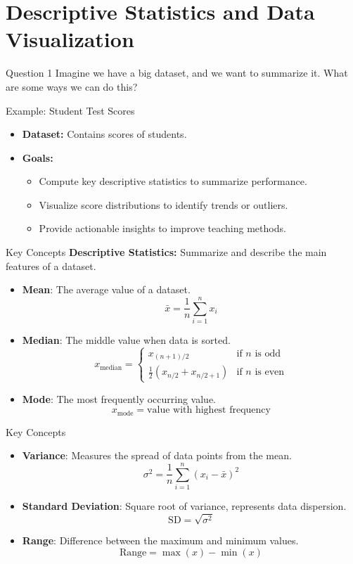 \documentclass{beamer}
\begin{document}
\section{Descriptive Statistics and Data Visualization}

\begin{frame}{Question 1}
    Imagine we have a big dataset, and we want to summarize it. What are some ways we can do this?
    \end{frame}
\begin{frame}{Example: Student Test Scores}
    \begin{itemize}
        \item \textbf{Dataset:} Contains scores of students.
        \item \textbf{Goals:}
        \begin{itemize}
            \item Compute key descriptive statistics to summarize performance.
            \item Visualize score distributions to identify trends or outliers.
            \item Provide actionable insights to improve teaching methods.
        \end{itemize}
    \end{itemize}
    \end{frame}

\begin{frame}{Key Concepts}
\textbf{Descriptive Statistics:} Summarize and describe the main features of a dataset.
\begin{itemize}
    \item \textbf{Mean}: The average value of a dataset.
    $$ \bar{x} = \frac{1}{n} \sum_{i=1}^{n} x_i $$
    \item \textbf{Median}: The middle value when data is sorted.
    $$ x_{\text{median}} = \begin{cases} x_{(n+1)/2} & \text{if } n \text{ is odd} \\ \frac{1}{2} (x_{n/2} + x_{n/2+1}) & \text{if } n \text{ is even} \end{cases} $$
    \item \textbf{Mode}: The most frequently occurring value.
    $$ x_{\text{mode}} = \text{value with highest frequency} $$
\end{itemize}
\end{frame}

\begin{frame}{Key Concepts}
\begin{itemize}
    \item \textbf{Variance}: Measures the spread of data points from the mean.
    $$ \sigma^2 = \frac{1}{n} \sum_{i=1}^{n} (x_i - \bar{x})^2 $$
    \item \textbf{Standard Deviation}: Square root of variance, represents data dispersion.
    $$ \text{SD} = \sqrt{\sigma^2} $$
    \item \textbf{Range}: Difference between the maximum and minimum values.
    $$ \text{Range} = \max(x) - \min(x) $$
\end{itemize}
\end{frame}
\end{document}
